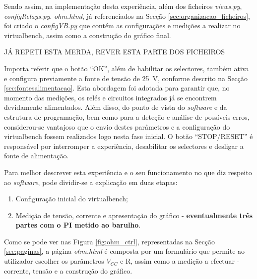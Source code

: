 Sendo assim, na implementação desta experiência, além dos ficheiros \textit{views.py}, \textit{configRelays.py}. \textit{ohm.html}, já referenciados na Secção \ref{sec:organizacao_ficheiros}, foi criado o \textit{configVB.py} que contém as configurações e medições a realizar no \acrshort{virtualbench}, assim como a construção do gráfico final.

JÁ REPETI ESTA MERDA, REVER ESTA PARTE DOS FICHEIROS




Importa referir que o botão ``OK'', além de habilitar os selectores, também ativa e configura previamente a fonte de tensão de \SI{25}{\volt}, conforme descrito na Secção \ref{sec:fontesalimentacao}. Esta abordagem foi adotada para garantir que, no momento das medições, os relés e circuitos integrados já se encontrem devidamente alimentados. Além disso, do ponto de vista do \textit{software} e da estrutura de programação, bem como para a deteção e análise de possíveis erros, considerou-se vantajoso que o envio destes parâmetros e a configuração do \acrshort{virtualbench} fossem realizados logo nesta fase inicial.
O botão ``STOP/RESET'' é responsável por interromper a experiência, desabilitar os selectores e desligar a fonte de alimentação.




Para melhor descrever esta experiência e o seu funcionamento no que diz respeito ao \textit{software}, pode dividir-se a explicação em duas etapas: 
\begin{enumerate}
	\item Configuração inicial do \acrshort{virtualbench};
	\item Medição de tensão, corrente e apresentação do gráfico - \textbf{eventualmente três partes com o PI metido ao barulho}. 
\end{enumerate}

Como se pode ver nas Figura \ref{fig:ohm_ctrl}, representadas na Secção \ref{sec:paginas}, a página \textit{ohm.html} é composta por um formulário que permite ao utilizador escolher os parâmetros $V_{CC}$ e R, assim como a medição a efectuar - corrente, tensão e a construção do gráfico.


